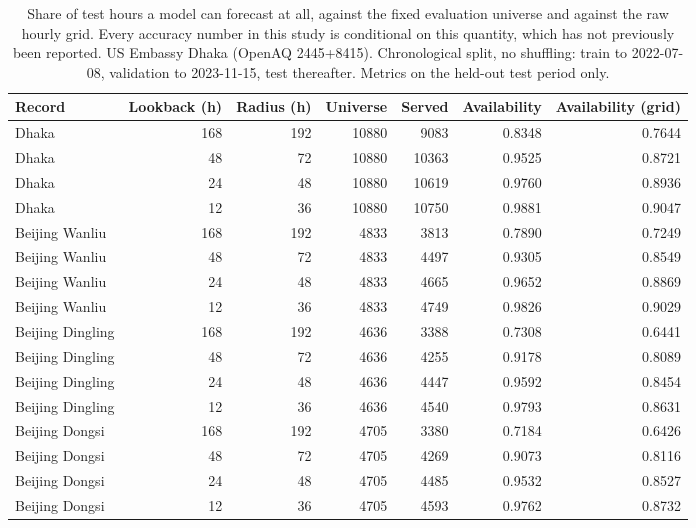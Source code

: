 \begin{table}[htbp]
\caption{Share of test hours a model can forecast at all, against the fixed evaluation universe and against the raw hourly grid. Every accuracy number in this study is conditional on this quantity, which has not previously been reported. US Embassy Dhaka (OpenAQ 2445+8415). Chronological split, no shuffling: train to 2022-07-08, validation to 2023-11-15, test thereafter. Metrics on the held-out test period only.}
\label{tab:forecast_availability}
\begin{tabular}{lrrrrrr}
\toprule
Record & Lookback (h) & Radius (h) & Universe & Served & Availability & Availability (grid) \\
\midrule
Dhaka & 168 & 192 & 10880 & 9083 & 0.8348 & 0.7644 \\
Dhaka & 48 & 72 & 10880 & 10363 & 0.9525 & 0.8721 \\
Dhaka & 24 & 48 & 10880 & 10619 & 0.9760 & 0.8936 \\
Dhaka & 12 & 36 & 10880 & 10750 & 0.9881 & 0.9047 \\
Beijing Wanliu & 168 & 192 & 4833 & 3813 & 0.7890 & 0.7249 \\
Beijing Wanliu & 48 & 72 & 4833 & 4497 & 0.9305 & 0.8549 \\
Beijing Wanliu & 24 & 48 & 4833 & 4665 & 0.9652 & 0.8869 \\
Beijing Wanliu & 12 & 36 & 4833 & 4749 & 0.9826 & 0.9029 \\
Beijing Dingling & 168 & 192 & 4636 & 3388 & 0.7308 & 0.6441 \\
Beijing Dingling & 48 & 72 & 4636 & 4255 & 0.9178 & 0.8089 \\
Beijing Dingling & 24 & 48 & 4636 & 4447 & 0.9592 & 0.8454 \\
Beijing Dingling & 12 & 36 & 4636 & 4540 & 0.9793 & 0.8631 \\
Beijing Dongsi & 168 & 192 & 4705 & 3380 & 0.7184 & 0.6426 \\
Beijing Dongsi & 48 & 72 & 4705 & 4269 & 0.9073 & 0.8116 \\
Beijing Dongsi & 24 & 48 & 4705 & 4485 & 0.9532 & 0.8527 \\
Beijing Dongsi & 12 & 36 & 4705 & 4593 & 0.9762 & 0.8732 \\
\bottomrule
\end{tabular}
\end{table}
